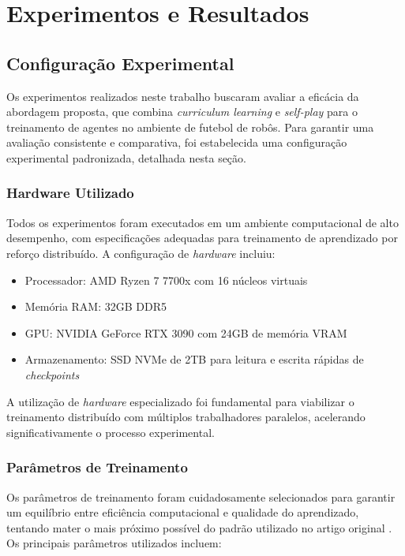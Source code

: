 \chapter{Experimentos e Resultados}
\label{cap:resultados}

\section{Configuração Experimental}
\label{sec:configuracao_experimental}

Os experimentos realizados neste trabalho buscaram avaliar a eficácia da abordagem proposta, que combina \textit{curriculum learning} e \textit{self-play} para o treinamento de agentes no ambiente de futebol de robôs. Para garantir uma avaliação consistente e comparativa, foi estabelecida uma configuração experimental padronizada, detalhada nesta seção.

\subsection{Hardware Utilizado}

Todos os experimentos foram executados em um ambiente computacional de alto desempenho, com especificações adequadas para treinamento de aprendizado por reforço distribuído. A configuração de \textit{hardware} incluiu:

\begin{itemize}
    \item Processador: AMD Ryzen 7 7700x com 16 núcleos virtuais
    \item Memória RAM: 32GB DDR5
    \item GPU: NVIDIA GeForce RTX 3090 com 24GB de memória VRAM
    \item Armazenamento: SSD NVMe de 2TB para leitura e escrita rápidas de \textit{checkpoints}
\end{itemize}

A utilização de \textit{hardware} especializado foi fundamental para viabilizar o treinamento distribuído com múltiplos trabalhadores paralelos, acelerando significativamente o processo experimental.

\subsection{Parâmetros de Treinamento}

Os parâmetros de treinamento foram cuidadosamente selecionados para garantir um equilíbrio entre eficiência computacional e qualidade do aprendizado, tentando mater o mais próximo possível do padrão utilizado no artigo original \cite{bruno_brandao}. Os principais parâmetros utilizados incluem:

